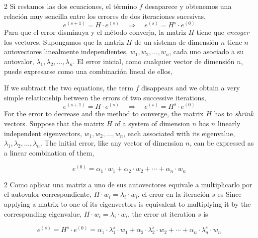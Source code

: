 \begin{paracol}{2}
\switchcolumn
Si restamos las dos ecuaciones, el término $f$ desaparece y obtenemos una relación muy sencilla entre los errores de dos iteraciones sucesivas,
\begin{equation*}
e^{(s+1)}=H\cdot e^{(s)}\quad\Rightarrow\quad e^{(s)}=H^s\cdot e^{(0)}
\end{equation*}
Para que el error disminuya y el método converja, la matriz $H$ tiene que \emph{encoger} los vectores. Supongamos que la matriz $H$ de un sistema de dimensión $n$ tiene $n$ autovectores linealmente independientes, $w_1, w_2, \dots, w_n$, cada uno asociado a su autovalor, $\lambda_1, \lambda_2, \dots, \lambda_n$. El error inicial, como cualquier vector de dimensión $n$, puede expresarse como una combinación lineal de ellos,

\switchcolumn
If we subtract the two equations, the term $f$ disappears and we obtain a very simple relationship between the errors of two successive iterations,
\begin{equation*}
e^{(s+1)}=H\cdot e^{(s)}\quad\Rightarrow\quad e^{(s)}=H^s\cdot e^{(0)}
\end{equation*}
For the error to decrease and the method to converge, the matrix $H$ has to \emph{shrink} vectors. Suppose that the matrix $H$ of a system of dimension $n$ has $n$ linearly independent eigenvectors, $w_1, w_2, \dots, w_n$, each associated with its eigenvalue, $\lambda_1, \lambda_2, \dots, \lambda_n$. The initial error, like any vector of dimension $n$, can be expressed as a linear combination of them,
\end{paracol}

\begin{equation*}
e^{(0)}=\alpha_1\cdot w_1+\alpha_2\cdot w_2+\cdots+\alpha_n\cdot w_n
\end{equation*}

\begin{paracol}{2}
Como aplicar una matriz a uno de sus autovectores equivale a multiplicarlo por el autovalor correspondiente, $H\cdot w_i=\lambda_i\cdot w_i$, el error en la iteración $s$ es
\switchcolumn
Since applying a matrix to one of its eigenvectors is equivalent to multiplying it by the corresponding eigenvalue, $H\cdot w_i=\lambda_i\cdot w_i$, the error at iteration $s$ is
\end{paracol}

\begin{equation*}
e^{(s)}=H^s\cdot e^{(0)}=\alpha_1\cdot \lambda_1^s \cdot  w_1+\alpha_2\cdot \lambda_2^s \cdot  w_2+\cdots+\alpha_n\cdot \lambda_n^s \cdot w_n
\end{equation*}

